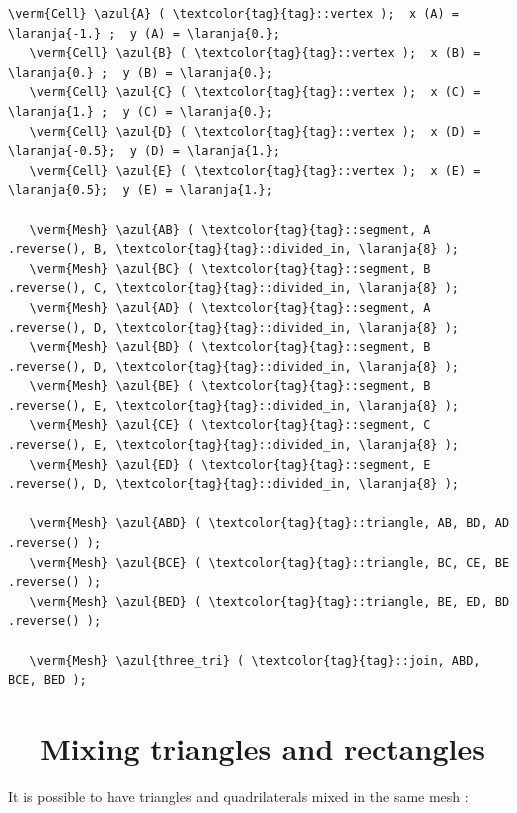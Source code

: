 \begin{Verbatim}[commandchars=\\\{\},formatcom=\small\tt,frame=single,
   label=parag-\ref{\numb section 1.\numb parag 5}.cpp,rulecolor=\color{moldura},
   baselinestretch=0.94,framesep=2mm]
   \verm{Cell} \azul{A} ( \textcolor{tag}{tag}::vertex );  x (A) = \laranja{-1.} ;  y (A) = \laranja{0.};
   \verm{Cell} \azul{B} ( \textcolor{tag}{tag}::vertex );  x (B) =  \laranja{0.} ;  y (B) = \laranja{0.};
   \verm{Cell} \azul{C} ( \textcolor{tag}{tag}::vertex );  x (C) =  \laranja{1.} ;  y (C) = \laranja{0.};
   \verm{Cell} \azul{D} ( \textcolor{tag}{tag}::vertex );  x (D) = \laranja{-0.5};  y (D) = \laranja{1.};
   \verm{Cell} \azul{E} ( \textcolor{tag}{tag}::vertex );  x (E) =  \laranja{0.5};  y (E) = \laranja{1.};

   \verm{Mesh} \azul{AB} ( \textcolor{tag}{tag}::segment, A .reverse(), B, \textcolor{tag}{tag}::divided_in, \laranja{8} );
   \verm{Mesh} \azul{BC} ( \textcolor{tag}{tag}::segment, B .reverse(), C, \textcolor{tag}{tag}::divided_in, \laranja{8} );
   \verm{Mesh} \azul{AD} ( \textcolor{tag}{tag}::segment, A .reverse(), D, \textcolor{tag}{tag}::divided_in, \laranja{8} );
   \verm{Mesh} \azul{BD} ( \textcolor{tag}{tag}::segment, B .reverse(), D, \textcolor{tag}{tag}::divided_in, \laranja{8} );
   \verm{Mesh} \azul{BE} ( \textcolor{tag}{tag}::segment, B .reverse(), E, \textcolor{tag}{tag}::divided_in, \laranja{8} );
   \verm{Mesh} \azul{CE} ( \textcolor{tag}{tag}::segment, C .reverse(), E, \textcolor{tag}{tag}::divided_in, \laranja{8} );
   \verm{Mesh} \azul{ED} ( \textcolor{tag}{tag}::segment, E .reverse(), D, \textcolor{tag}{tag}::divided_in, \laranja{8} );

   \verm{Mesh} \azul{ABD} ( \textcolor{tag}{tag}::triangle, AB, BD, AD .reverse() );
   \verm{Mesh} \azul{BCE} ( \textcolor{tag}{tag}::triangle, BC, CE, BE .reverse() );
   \verm{Mesh} \azul{BED} ( \textcolor{tag}{tag}::triangle, BE, ED, BD .reverse() );

   \verm{Mesh} \azul{three_tri} ( \textcolor{tag}{tag}::join, ABD, BCE, BED );
\end{Verbatim}


\section{~~Mixing triangles and rectangles}\label{\numb section 1.\numb parag 6}

It is possible to have triangles and quadrilaterals mixed in the same mesh :

